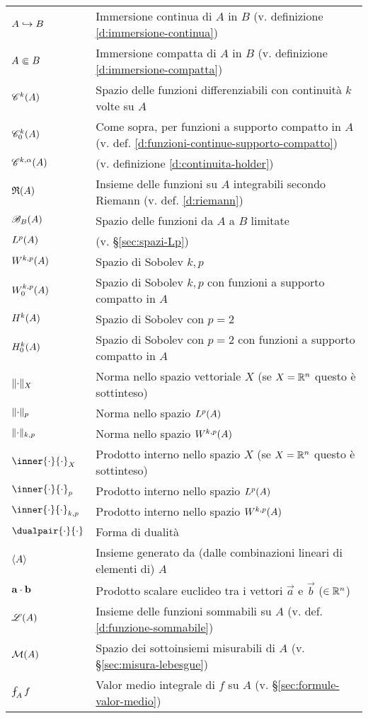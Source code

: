 \begin{tabular}[h]{ll}
    $A\emb B$                    & Immersione continua di $A$ in $B$ (v. definizione \ref{d:immersione-continua})\\
    $A\cemb B$                   & Immersione compatta di $A$ in $B$ (v. definizione \ref{d:immersione-compatta})\\
    $\cont[k]{A}$                & Spazio delle funzioni differenziabili con continuità $k$ volte su $A$\\
    $\contsc[k]{A}$              & Come sopra, per funzioni a supporto compatto in $A$ (v. def. \ref{d:funzioni-continue-supporto-compatto})\\
    $\cont[k,\alpha]{A}$         & (v. definizione \ref{d:continuita-holder})\\
    $\rie{A}$                    & Insieme delle funzioni su $A$ integrabili secondo Riemann (v. def. \ref{d:riemann})\\
    $\bounded[B]{A}$             & Spazio delle funzioni da $A$ a $B$ limitate\\
    $\leb[p]{A}$                 & (v. §\ref{sec:spazi-Lp})\\
    $\sobW[k,p]{A}$              & Spazio di Sobolev $k,p$\\
    $\sobWc[k,p]{A}$             & Spazio di Sobolev $k,p$ con funzioni a supporto compatto in $A$\\
    $\sobH[k]{A}$                & Spazio di Sobolev con $p=2$\\
    $\sobHc[k]{A}$               & Spazio di Sobolev con $p=2$ con funzioni a supporto compatto in $A$\\
    $\norm{\cdot}_X$             & Norma nello spazio vettoriale $X$ (se $X=\R^n$ questo è sottinteso)\\
    $\norm{\cdot}_p$             & Norma nello spazio $\leb[p]{A}$\\
    $\norm{\cdot}_{k,p}$         & Norma nello spazio $\sobW[k,p]{A}$\\
    $\inner{\cdot}{\cdot}_X$     & Prodotto interno nello spazio $X$ (se $X=\R^n$ questo è sottinteso)\\
    $\inner{\cdot}{\cdot}_p$     & Prodotto interno nello spazio $\leb[p]{A}$\\
    $\inner{\cdot}{\cdot}_{k,p}$ & Prodotto interno nello spazio $\sobW[k,p]{A}$\\
    $\dualpair{\cdot}{\cdot}$    & Forma di dualità\\
    $\gen{A}$                    & Insieme generato da (dalle combinazioni lineari di elementi di) $A$\\
    $\scalar{\vec a}{\vec b}$    & Prodotto scalare euclideo tra i vettori $\vec a$ e $\vec b$ ($\in\R^n$)\\
    $\summ{A}$                   & Insieme delle funzioni sommabili su $A$ (v. def. \ref{d:funzione-sommabile})\\
    $\mis(A)$                    & Spazio dei sottoinsiemi misurabili di $A$ (v. §\ref{sec:misura-lebesgue})\\
    $\avint_A f$                 & Valor medio integrale di $f$ su $A$ (v. §\ref{sec:formule-valor-medio})\\
\end{tabular}
